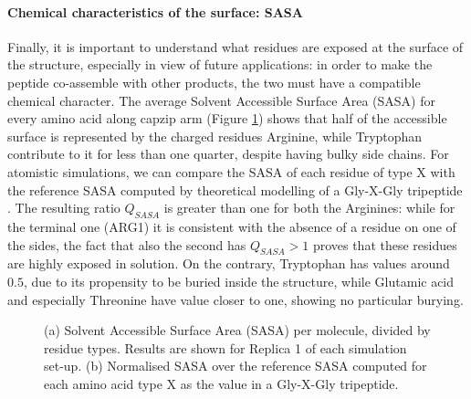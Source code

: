 \paragraph{Chemical characteristics of the surface: SASA} Finally, it is important to understand what residues are exposed at the surface of the structure, especially in view of future applications: in order to make the peptide co-assemble with other products, the two must have a compatible chemical character. The average Solvent Accessible Surface Area (SASA) for every amino acid along capzip arm (Figure \ref{fig:BTI_sasa_exposed}) shows that half of the accessible surface is represented by the charged residues Arginine, while Tryptophan contribute to it for less than one quarter, despite having bulky side chains.
%
For atomistic simulations, we can compare the SASA of each residue of type X with the reference SASA computed by theoretical modelling of a Gly-X-Gly tripeptide \citep{Tien2013}. The resulting ratio $Q_{SASA}$ is greater than one for both the Arginines: while for the terminal one (ARG1) it is consistent with the absence of a residue on one of the sides, the fact that also the second has $Q_{SASA}>1$ proves that these residues are highly exposed in solution. On the contrary, Tryptophan has values around $0.5$, due to its propensity to be buried inside the structure, while Glutamic acid and especially Threonine have value closer to one, showing no particular burying.
\begin{figure}[t]
\centering
{} 
\caption[SASA per residue of a buckyball in solution]{(a) Solvent Accessible Surface Area (SASA) per molecule, divided by residue types. Results are shown for Replica 1 of each simulation set-up. (b) Normalised SASA over the reference SASA computed for each amino acid type X as the value in a Gly-X-Gly tripeptide.}
\label{fig:BTI_sasa_exposed}
\end{figure}


